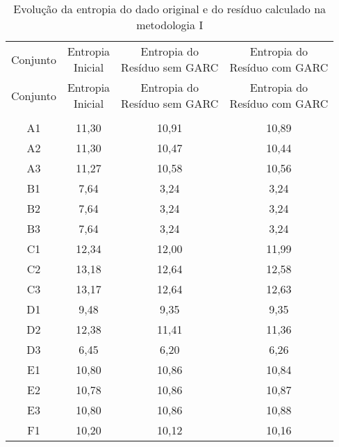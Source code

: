 \clearpage

\begin{center}
\begin{longtable}{cccc}
\toprule
\rowcolor{white}
\caption[Metodologia I: evolução da entropia]{Evolução da entropia do dado
original e do resíduo calculado na metodologia I}
\label{tab:EvolucaoEntropiaMet1}\\
\midrule
Conjunto & \specialcell{Entropia \\Inicial} & \specialcell{Entropia do
\\Resíduo sem GARC} & \specialcell{Entropia do
\\Resíduo com GARC}  \\
\midrule
\endfirsthead
\midrule
\rowcolor{white}
Conjunto & \specialcell{Entropia \\Inicial} & \specialcell{Entropia do
\\Resíduo sem GARC} & \specialcell{Entropia do
\\Resíduo com GARC}  \\
\toprule
\endhead
\midrule \\ %
\endfoot
\bottomrule 
\endlastfoot
    A1    & 11,30 & 10,91 & 10,89 \\
    A2    & 11,30 & 10,47 & 10,44 \\
    A3    & 11,27 & 10,58 & 10,56 \\
    B1    & 7,64  & 3,24  & 3,24 \\
    B2    & 7,64  & 3,24  & 3,24 \\
    B3    & 7,64  & 3,24  & 3,24 \\
    C1    & 12,34 & 12,00 & 11,99 \\
    C2    & 13,18 & 12,64 & 12,58 \\
    C3    & 13,17 & 12,64 & 12,63 \\
    D1    & 9,48  & 9,35  & 9,35 \\
    D2    & 12,38 & 11,41 & 11,36 \\
    D3    & 6,45  & 6,20  & 6,26 \\
    E1    & 10,80 & 10,86 & 10,84 \\
    E2    & 10,78 & 10,86 & 10,87 \\
    E3    & 10,80 & 10,86 & 10,88 \\
    F1    & 10,20 & 10,12 & 10,16 \\

\end{longtable}
\end{center}
